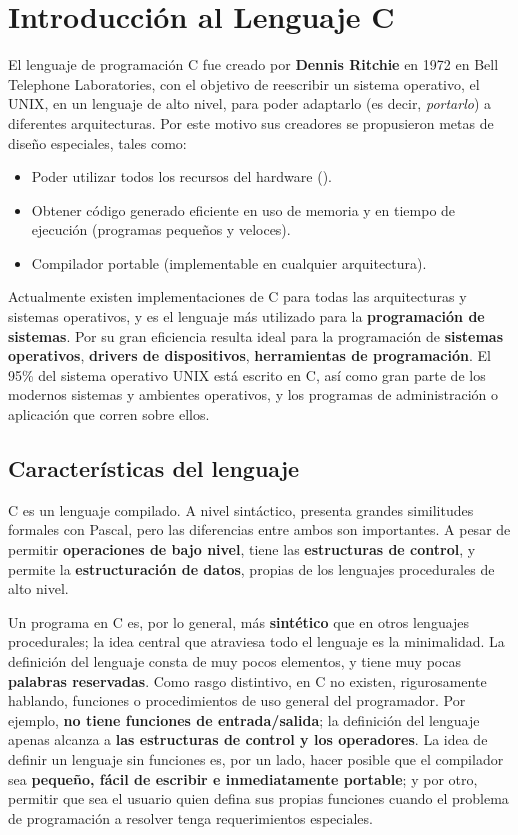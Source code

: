 
\chapter{Introducción al Lenguaje C}


El lenguaje de programación C fue creado por \textbf{Dennis Ritchie} en 1972 en
Bell Telephone Laboratories, con el objetivo de reescribir un sistema
operativo, el UNIX, en un lenguaje de alto nivel, para poder adaptarlo
(es decir, \textit{portarlo}) a diferentes arquitecturas. Por este motivo sus
creadores se propusieron metas de diseño especiales, tales como: 

\begin{itemize}
\item Poder utilizar todos los recursos del hardware (). 
\item Obtener código generado eficiente en uso de memoria y en tiempo de ejecución (programas pequeños y veloces).
\item Compilador portable (implementable en cualquier arquitectura).
\end{itemize}


Actualmente existen implementaciones de C para todas las arquitecturas y
sistemas operativos, y es el lenguaje más utilizado para la
\textbf{programación de sistemas}. Por su gran eficiencia resulta ideal para
la programación de \textbf{sistemas operativos}, \textbf{drivers de dispositivos},
\textbf{herramientas de programación}. El 95\% del sistema operativo UNIX
está escrito en C, así como gran parte de los modernos
sistemas y ambientes operativos, y los programas de administración o aplicación que corren
sobre ellos.


\section{Características del lenguaje}
C es un lenguaje compilado. A nivel sintáctico, presenta grandes
similitudes formales con Pascal, pero las diferencias entre ambos son
importantes. A pesar de permitir \textbf{operaciones de bajo nivel}, tiene las
\textbf{estructuras de control}, y permite la \textbf{estructuración de datos}, propias
de los lenguajes procedurales de alto nivel. 

Un programa en C es, por lo general, más \textbf{sintético} que en otros
lenguajes procedurales; la idea central que atraviesa todo
el lenguaje es la minimalidad. La definición del lenguaje consta de
muy pocos elementos, y tiene muy pocas \textbf{palabras reservadas}. Como rasgo
distintivo, en C no existen, rigurosamente hablando, funciones o
procedimientos de uso general del programador. Por ejemplo, \textbf{no tiene
funciones de entrada/salida}; la definición del lenguaje apenas
alcanza a \textbf{las estructuras de control y los operadores}. La idea de
definir un lenguaje sin funciones es, por un lado, hacer posible que el
compilador sea \textbf{pequeño, fácil de escribir e inmediatamente
portable}; y por otro, permitir que sea el usuario quien defina sus
propias funciones cuando el problema de programación a resolver tenga
requerimientos especiales. 

